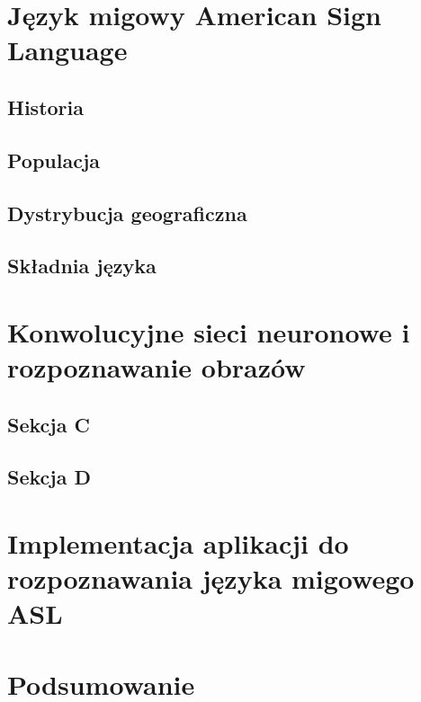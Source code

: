 \documentclass[a4paper,12pt]{book} %
\begin{document}
\chapter{Język migowy American Sign Language}

\section{Historia}
\section{Populacja}
\section{Dystrybucja geograficzna}
\section{Składnia języka}


\chapter{Konwolucyjne sieci neuronowe i rozpoznawanie obrazów}

\section{Sekcja C}
\section{Sekcja D}

\chapter{Implementacja aplikacji do rozpoznawania języka migowego ASL}

\chapter{Podsumowanie}


\listoftables{} %

\listoffigures{} %

\listofcodes
{}



\end{document}
